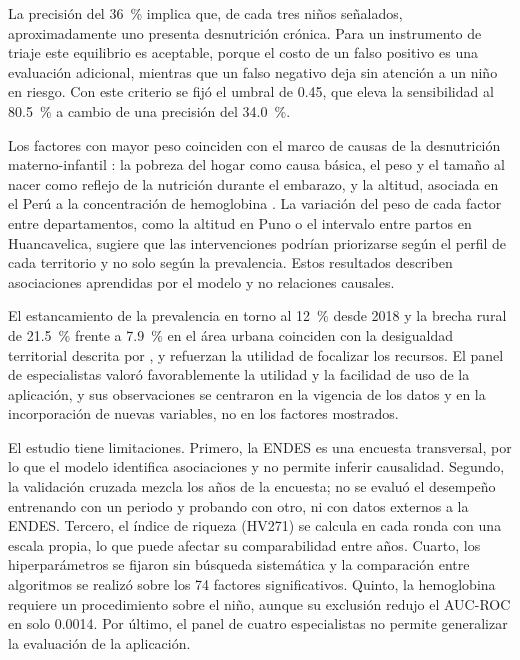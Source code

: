\documentclass[final,5p,times,twocolumn,authoryear,lefttitle]{elsarticle}
\begin{document}
La precisión del 36~\% implica que, de cada tres niños señalados, aproximadamente uno presenta desnutrición crónica. Para un instrumento de triaje este equilibrio es aceptable, porque el costo de un falso positivo es una evaluación adicional, mientras que un falso negativo deja sin atención a un niño en riesgo. Con este criterio se fijó el umbral de 0.45, que eleva la sensibilidad al 80.5~\% a cambio de una precisión del 34.0~\%.

Los factores con mayor peso coinciden con el marco de causas de la desnutrición materno-infantil \citep{black2013lancet,victora2021lancet}: la pobreza del hogar como causa básica, el peso y el tamaño al nacer como reflejo de la nutrición durante el embarazo, y la altitud, asociada en el Perú a la concentración de hemoglobina \citep{accinelli2020anemia}. La variación del peso de cada factor entre departamentos, como la altitud en Puno o el intervalo entre partos en Huancavelica, sugiere que las intervenciones podrían priorizarse según el perfil de cada territorio y no solo según la prevalencia. Estos resultados describen asociaciones aprendidas por el modelo y no relaciones causales.

El estancamiento de la prevalencia en torno al 12~\% desde 2018 y la brecha rural de 21.5~\% frente a 7.9~\% en el área urbana coinciden con la desigualdad territorial descrita por \citet{santos2021peru}, y refuerzan la utilidad de focalizar los recursos. El panel de especialistas valoró favorablemente la utilidad y la facilidad de uso de la aplicación, y sus observaciones se centraron en la vigencia de los datos y en la incorporación de nuevas variables, no en los factores mostrados.

El estudio tiene limitaciones. Primero, la ENDES es una encuesta transversal, por lo que el modelo identifica asociaciones y no permite inferir causalidad. Segundo, la validación cruzada mezcla los años de la encuesta; no se evaluó el desempeño entrenando con un periodo y probando con otro, ni con datos externos a la ENDES. Tercero, el índice de riqueza (HV271) se calcula en cada ronda con una escala propia, lo que puede afectar su comparabilidad entre años. Cuarto, los hiperparámetros se fijaron sin búsqueda sistemática y la comparación entre algoritmos se realizó sobre los 74 factores significativos. Quinto, la hemoglobina requiere un procedimiento sobre el niño, aunque su exclusión redujo el AUC-ROC en solo 0.0014. Por último, el panel de cuatro especialistas no permite generalizar la evaluación de la aplicación.
\end{document}
